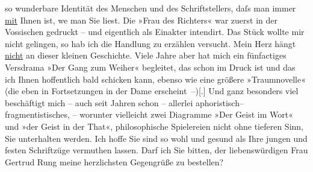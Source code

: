 \begin{ledgroupsized}[t]{13cm}
                    so wunder{\pb}bare Identität des Menschen und des
                    Schriftstellers, daſs man immer \uline{mit} Ihnen ist,
                        we{\geminationn} man Sie liest.\pend
           \pstart
           Die »Frau des Richters« war zuerst in der Vossischen gedruckt – und eigentlich als
                    Einakter intendirt. Das Stück wollte mir nicht gelingen, so hab ich die Handlung
                    zu erzählen versucht. Mein Herz hängt \uline{nicht} an
                    dieser kleinen Geschichte. Viele Jahre aber hat mich ein fünfactiges Versdrama
                        »Der Gang zum Weiher« begleitet, das schon
                    im Druck ist und das ich Ihnen hoffentlich bald schicken kann, ebenso wie eine
                    größere »Traumnovelle« (die eben in
                    Fortsetzungen in der Dame
                        erscheint –){[}.{]}{ }{\pb}Und ganz besonders viel beschäftigt mich –
                    auch seit Jahren schon – allerlei aphoristisch–fragmentistisches, – worunter
                    vielleicht zwei Diagramme »Der Geist im Wort« und
                        »der Geist in der That«, philosophische Spielereien nicht ohne tieferen
                    Sinn, Sie unterhalten werden.\pend
           \pstart
           Ich hoffe Sie sind so wohl und gesund als Ihre jungen und festen Schriftzüge
                    vermuthen lassen. Darf ich Sie bitten, der liebenswürdigen Frau Gertrud Rung meine herzlichsten Gegengrüße zu bestellen?

\end{ledgroupsized}
